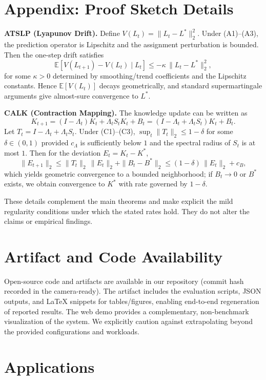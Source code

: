 \documentclass[conference]{IEEEtran}
\begin{document}
\section{Appendix: Proof Sketch Details}

\noindent\textbf{ATSLP (Lyapunov Drift).} Define $V(L_t)=\|L_t-L^*\|_2^2$. Under (A1)--(A3), the prediction operator is Lipschitz and the assignment perturbation is bounded. Then the one-step drift satisfies
\[\mathbb{E}[V(L_{t+1})-V(L_t)\mid L_t]\le -\kappa\,\|L_t-L^*\|_2^2,\]
for some $\kappa>0$ determined by smoothing/trend coefficients and the Lipschitz constants. Hence $\mathbb{E}[V(L_t)]$ decays geometrically, and standard supermartingale arguments give almost-sure convergence to $L^*$.

\noindent\textbf{CALK (Contraction Mapping).} The knowledge update can be written as
\[K_{t+1}=(I-\Lambda_t)K_t+\Lambda_t S_t K_t+B_t=(I-\Lambda_t+\Lambda_t S_t)K_t+B_t.\]
Let $T_t=I-\Lambda_t+\Lambda_t S_t$. Under (C1)--(C3), $\sup_t\|T_t\|_2\le 1-\delta$ for some $\delta\in(0,1)$ provided $c_\Lambda$ is sufficiently below $1$ and the spectral radius of $S_t$ is at most $1$. Then for the deviation $E_t=K_t-K^*$,
\[\|E_{t+1}\|_2\le \|T_t\|_2\,\|E_t\|_2+\|B_t-B^*\|_2\le (1-\delta)\,\|E_t\|_2+c_B,\]
which yields geometric convergence to a bounded neighborhood; if $B_t\to 0$ or $B^*$ exists, we obtain convergence to $K^*$ with rate governed by $1-\delta$.

\noindent These details complement the main theorems and make explicit the mild regularity conditions under which the stated rates hold. They do not alter the claims or empirical findings.

\section{Artifact and Code Availability}

Open-source code and artifacts are available in our repository (commit hash recorded in the camera-ready). The artifact includes the evaluation scripts, JSON outputs, and LaTeX snippets for tables/figures, enabling end-to-end regeneration of reported results. The web demo provides a complementary, non-benchmark visualization of the system. We explicitly caution against extrapolating beyond the provided configurations and workloads.

\section{Applications}
\end{document}
